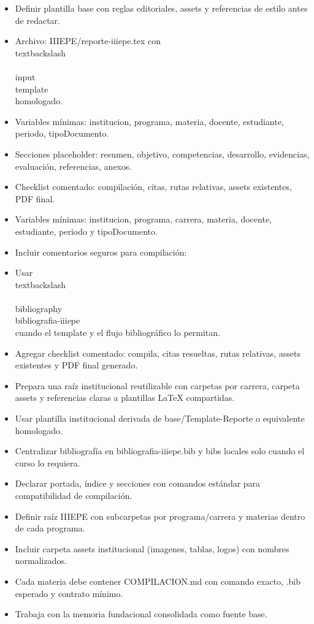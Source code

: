 \documentclass[12pt]{article}
\begin{document}
\begin{itemize}[leftmargin=*]
  \item Definir plantilla base con reglas editoriales, assets y referencias de estilo antes de redactar.
  \item Archivo: IIIEPE/reporte-iiiepe.tex con \\textbackslash\\{\\}input\\{template\\} homologado.
  \item Variables mínimas: institucion, programa, materia, docente, estudiante, periodo, tipoDocumento.
  \item Secciones placeholder: resumen, objetivo, competencias, desarrollo, evidencias, evaluación, referencias, anexos.
  \item Checklist comentado: compilación, citas, rutas relativas, assets existentes, PDF final.
  \item Variables mínimas: institucion, programa, carrera, materia, docente, estudiante, periodo y tipoDocumento.
  \item Incluir comentarios seguros para compilación: \\%
  \item Usar \\textbackslash\\{\\}bibliography\\{bibliografia-iiiepe\\} cuando el template y el flujo bibliográfico lo permitan.
  \item Agregar checklist comentado: compila, citas resueltas, rutas relativas, assets existentes y PDF final generado.
  \item Prepara una raíz institucional reutilizable con carpetas por carrera, carpeta assets y referencias claras a plantillas LaTeX compartidas.
  \item Usar plantilla institucional derivada de base/Template-Reporte o equivalente homologado.
  \item Centralizar bibliografía en bibliografia-iiiepe.bib y bibs locales solo cuando el curso lo requiera.
  \item Declarar portada, índice y secciones con comandos estándar para compatibilidad de compilación.
  \item Definir raíz IIIEPE con subcarpetas por programa/carrera y materias dentro de cada programa.
  \item Incluir carpeta assets institucional (imagenes, tablas, logos) con nombres normalizados.
  \item Cada materia debe contener COMPILACION.md con comando exacto, .bib esperado y contrato mínimo.
  \item Trabaja con la memoria fundacional consolidada como fuente base.
\end{itemize}
\end{document}
